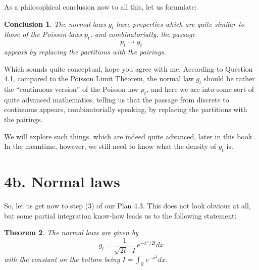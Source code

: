 \documentclass[12pt]{amsbook}
\newtheorem{theorem}{Theorem}[chapter]
\newtheorem{conclusion}[theorem]{Conclusion}
\begin{document}
As a philosophical conclusion now to all this, let us formulate:

\begin{conclusion}
The normal laws $g_t$ have properties which are quite similar to those of the Poisson laws $p_t$, and combinatorially, the passage
$$p_t\to g_t$$
appears by replacing the partitions with the pairings.
\end{conclusion}

Which sounds quite conceptual, hope you agree with me. According to Question 4.1, compared to the Poisson Limit Theorem, the normal law $g_t$ should be rather the ``continuous version'' of the Poisson law $p_t$, and here we are into some sort of quite advanced mathematics, telling us that the passage from discrete to continuous appears, combinatorially speaking, by replacing the partitions with the pairings.

\bigskip

We will explore such things, which are indeed quite advanced, later in this book. In the meantime, however, we still need to know what the density of $g_t$ is.

\section*{4b. Normal laws}

So, let us get now to step (3) of our Plan 4.3. This does not look obvious at all, but some partial integration know-how leads us to the following statement:


\begin{theorem}
The normal laws are given by
$$g_t=\frac{1}{\sqrt{2t}\cdot I}\,e^{-x^2/2t}dx$$
with the constant on the bottom being $I=\int_\mathbb Re^{-x^2}dx$.
\end{theorem}
\end{document}
